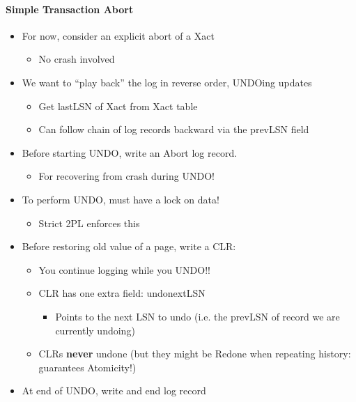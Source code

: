 \paragraph{Simple Transaction Abort}
\begin{itemize}
\item For now, consider an explicit abort of a Xact
  \begin{itemize}
  \item No crash involved
  \end{itemize}

\item We want to ``play back'' the log in reverse order,
  UNDOing updates
  \begin{itemize}
  \item Get lastLSN of Xact from Xact table
  \item Can follow chain of log records backward via the prevLSN
    field
  \end{itemize}

\item Before starting UNDO, write an Abort log record.
  \begin{itemize}
  \item For recovering from crash during UNDO!
  \end{itemize}
\end{itemize}

\begin{itemize}
\item To perform UNDO, must have a lock on data!
  \begin{itemize}
  \item Strict 2PL enforces this
  \end{itemize}

\item Before restoring old value of a page, write a CLR:
  \begin{itemize}
  \item You continue logging while you UNDO!!
  \item CLR has one extra field: undonextLSN
    \begin{itemize}
    \item Points to the next LSN to undo (i.e. the prevLSN of record
      we are currently undoing)
    \end{itemize}
  \item CLRs \textbf{never} undone (but they might be Redone when
    repeating history: guarantees Atomicity!)
  \end{itemize}

\item At end of UNDO, write and end log record
\end{itemize}


